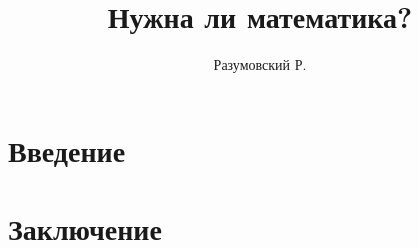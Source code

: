 \documentclass[12pt,a4paper]{article}
\title{Нужна ли математика?}
\date{} %
\author{Разумовский Р.}
\numberwithin{equation}{section}
\begin{document}
    \maketitle

    \begin{abstract}
        
    \end{abstract}


    \section{Введение} \label{sec:introduction}
    


    \section{Заключение}\label{sec:conclusions}
    
\end{document}
